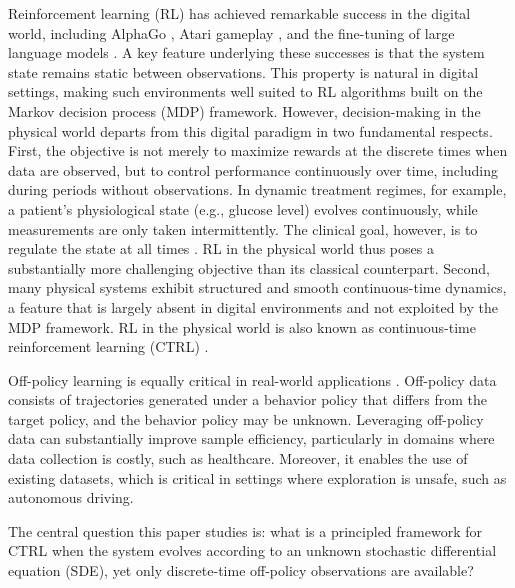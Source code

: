 \documentclass[12pt]{article}
\begin{document}
Reinforcement learning (RL) has achieved remarkable success in the digital world, including AlphaGo \citep{silver2016mastering}, Atari gameplay \citep{mnih2015human}, and the fine-tuning of large language models \citep{Ziegler2019}. A key feature underlying these successes is that the system state remains static between observations. This property is natural in digital settings, making such environments well suited to RL algorithms built on the Markov decision process (MDP) framework. However, decision-making in the physical world departs from this digital paradigm in two fundamental respects. First, the objective is not merely to maximize rewards at the discrete times when data are observed, but to control performance continuously over time, including during periods without observations. In dynamic treatment regimes, for example, a patient's physiological state (e.g., glucose level) evolves continuously, while measurements are only taken intermittently. The clinical goal, however, is to regulate the state at all times \citep{emerson2023offline, cobelli2009diabetes, battelino2019clinical}. RL in the physical world thus poses a substantially more challenging objective than its classical counterpart. Second, many physical systems exhibit structured and smooth continuous-time dynamics, a feature that is largely absent in digital environments and not exploited by the MDP framework. RL in the physical world is also known as continuous-time reinforcement learning (CTRL) \citep{wang2020reinforcement}.


Off-policy learning is equally critical in real-world applications \citep{watkins1992q, sutton1998reinforcement, ma2020off}. Off-policy data consists of trajectories generated under a behavior policy that differs from the target policy, and the behavior policy may be unknown. Leveraging off-policy data can substantially improve sample efficiency, particularly in domains where data collection is costly, such as healthcare. Moreover, it enables the use of existing datasets, which is critical in settings where exploration is unsafe, such as autonomous driving.


The central question this paper studies is: what is a principled framework for CTRL when the system evolves according to an unknown stochastic differential equation (SDE), yet only discrete-time off-policy observations are available?
\end{document}
